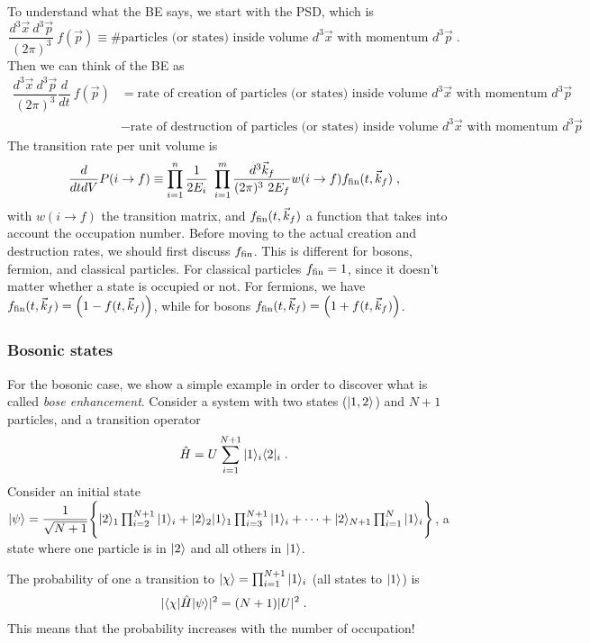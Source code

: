 \documentclass[11pt,a4paper]{article}
\begin{document}
To understand what the BE says, we start with the PSD, which is
%
\begin{equation}
	\dfrac{d^3 \vec{x} \ d^3 \vec{p}}{(2\pi)^3} \ f(\vec{p})  \equiv \# \text{particles (or states) inside volume $d^3 \vec{x}$ with momentum $d^3 \vec{p}$} \;.
	\label{eq:PSD_description}
\end{equation}
%
Then we can think of the BE as  
%
\begin{align}
	\dfrac{d^3 \vec{x} \ d^3 \vec{p}}{(2\pi)^3}	\dfrac{d}{dt}  \ f(\vec{p})  &= 
	\text{rate of creation of particles (or states)   inside volume $d^3 \vec{x}$ with momentum $d^3 \vec{p}$} \nonumber \\
	&-\text{rate of destruction of particles (or states)   inside volume $d^3 \vec{x}$ with momentum $d^3 \vec{p}$} \;.
	\label{eq:BE_description}
\end{align}
%
The transition rate per unit volume is 
%
$$
\dfrac{d}{dt dV} P(i\to f) \equiv \prod_{i=1}^{n} \dfrac{1}{2E_{i}} \ \prod_{i=1}^{m} \dfrac{d^3\vec{k}_f}{(2\pi)^3 \ 2E_{f}}  w(i\to f) 
f_{\rm fin}(t,\vec{k}_f)  \;,
$$
%
with $w(i\to f)$ the transition matrix, and $f_{\rm fin}(t,\vec{k}_f)$ a function that takes into account the occupation number. Before moving to the actual creation and destruction rates, we should first discuss $f_{\rm fin}$. This is different for bosons, fermion, and classical particles. For classical particles $f_{\rm fin} = 1$, since it doesn't matter whether a state is occupied or not. For fermions, we have $f_{\rm fin}(t,\vec{k}_f) =\left( 1 -  f(t, \vec{k}_f )  \right)$, while for bosons $f_{\rm fin}(t,\vec{k}_f) = \left( 1 +  f(t, \vec{k}_f)  \right)$.


\subsubsection*{Bosonic states}
%
For the bosonic case, we show a simple example in order to discover what is called {\em bose enhancement}. Consider a system with two states ($| 1,2 \rangle$) and $N+1$ particles, and a transition operator
%
$$
\hat H = U \sum_{i=1}^{N+1} | 1 \rangle_i \langle 2 |_i \;.
$$
%
Consider an initial state $| \psi \rangle = \dfrac{1}{\sqrt{N+1}} \Bigg\{  | 2 \rangle_1   \prod_{i=2}^{N+1} | 1 \rangle_i + 
	| 2 \rangle_2 | 1 \rangle_1 \prod_{i=3}^{N+1} | 1 \rangle_i  + \cdots +  | 2 \rangle_{N+1} \prod_{i=1}^{N} | 1 \rangle_i  \Bigg\} $, \ie a state where
one particle is in $| 2 \rangle$ and all others in $| 1 \rangle$.

The probability of one a transition to $| \chi \rangle = \prod_{i=1}^{N+1} | 1 \rangle_i$ (\ie all states to $| 1 \rangle$) is
%
\begin{align*}
	|\langle \chi | \hat{H}  | \psi \rangle |^2 = (N+1) |U|^2 \;.
\end{align*}
%
This means that the probability increases with the number of occupation!
\end{document}
